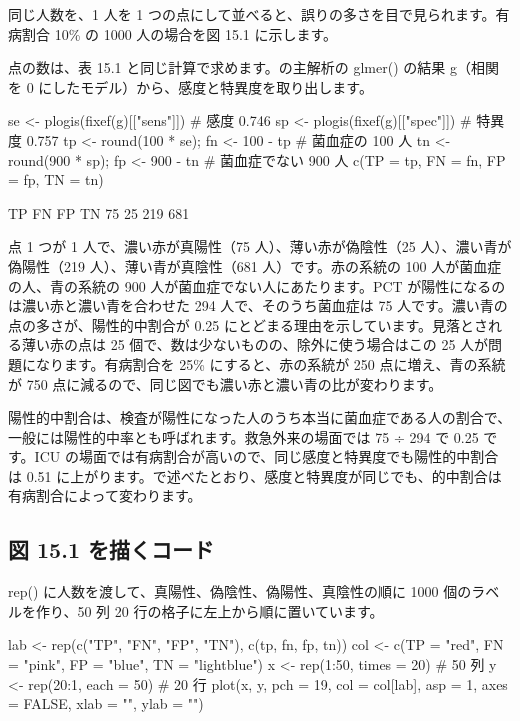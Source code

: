同じ人数を、1 人を 1 つの点にして並べると、誤りの多さを目で見られます。有病割合 10\% の 1000 人の場合を図 15.1 に示します。


点の数は、表 15.1 と同じ計算で求めます。の主解析の glmer() の結果 g（相関を 0 にしたモデル）から、感度と特異度を取り出します。

\begin{rcode}
se <- plogis(fixef(g)[["sens"]])         # 感度 0.746
sp <- plogis(fixef(g)[["spec"]])         # 特異度 0.757
tp <- round(100 * se); fn <- 100 - tp    # 菌血症の 100 人
tn <- round(900 * sp); fp <- 900 - tn    # 菌血症でない 900 人
c(TP = tp, FN = fn, FP = fp, TN = tn)
\end{rcode}

\begin{rout}
 TP  FN  FP  TN
 75  25 219 681
\end{rout}

点 1 つが 1 人で、濃い赤が真陽性（75 人）、薄い赤が偽陰性（25 人）、濃い青が偽陽性（219 人）、薄い青が真陰性（681 人）です。赤の系統の 100 人が菌血症の人、青の系統の 900 人が菌血症でない人にあたります。PCT が陽性になるのは濃い赤と濃い青を合わせた 294 人で、そのうち菌血症は 75 人です。濃い青の点の多さが、陽性的中割合が 0.25 にとどまる理由を示しています。見落とされる薄い赤の点は 25 個で、数は少ないものの、除外に使う場合はこの 25 人が問題になります。有病割合を 25\% にすると、赤の系統が 250 点に増え、青の系統が 750 点に減るので、同じ図でも濃い赤と濃い青の比が変わります。

陽性的中割合は、検査が陽性になった人のうち本当に菌血症である人の割合で、一般には陽性的中率とも呼ばれます。救急外来の場面では 75 ÷ 294 で 0.25 です。ICU の場面では有病割合が高いので、同じ感度と特異度でも陽性的中割合は 0.51 に上がります。で述べたとおり、感度と特異度が同じでも、的中割合は有病割合によって変わります。

\subsection{\hatten 図 15.1 を描くコード}
\label{sec:15-1-1}

rep() に人数を渡して、真陽性、偽陰性、偽陽性、真陰性の順に 1000 個のラベルを作り、50 列 20 行の格子に左上から順に置いています。

\begin{rcode}
lab <- rep(c("TP", "FN", "FP", "TN"), c(tp, fn, fp, tn))
col <- c(TP = "red", FN = "pink", FP = "blue", TN = "lightblue")
x <- rep(1:50, times = 20)     # 50 列
y <- rep(20:1, each = 50)      # 20 行
plot(x, y, pch = 19, col = col[lab], asp = 1,
     axes = FALSE, xlab = "", ylab = "")
\end{rcode}

